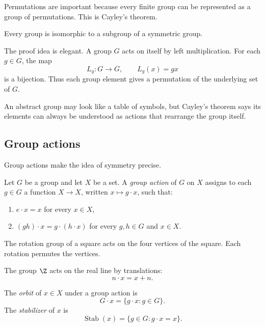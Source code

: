 Permutations are important because every finite group can be represented as a
group of permutations. This is Cayley's theorem.

\begin{theorem}
Every group is isomorphic to a subgroup of a symmetric group.
\end{theorem}

The proof idea is elegant. A group $G$ acts on itself by left multiplication.
For each $g\in G$, the map
\[
L_g:G\to G,\qquad L_g(x)=gx
\]
is a bijection. Thus each group element gives a permutation of the underlying
set of $G$.

\begin{intuitionbox}
An abstract group may look like a table of symbols, but Cayley's theorem says
its elements can always be understood as actions that rearrange the group
itself.
\end{intuitionbox}

\subsection{Group actions}

Group actions make the idea of symmetry precise.

\begin{definition}
Let $G$ be a group and let $X$ be a set. A \emph{group action} of $G$ on $X$
assigns to each $g\in G$ a function $X\to X$, written $x\mapsto g\cdot x$,
such that:
\begin{enumerate}
\item $e\cdot x=x$ for every $x\in X$,
\item $(gh)\cdot x=g\cdot(h\cdot x)$ for every $g,h\in G$ and $x\in X$.
\end{enumerate}
\end{definition}

\begin{example}
The rotation group of a square acts on the four vertices of the square. Each
rotation permutes the vertices.
\end{example}

\begin{example}
The group $\Z$ acts on the real line by translations:
\[
n\cdot x=x+n.
\]
\end{example}

\begin{definition}
The \emph{orbit} of $x\in X$ under a group action is
\[
G\cdot x=\{g\cdot x:g\in G\}.
\]
The \emph{stabilizer} of $x$ is
\[
\operatorname{Stab}(x)=\{g\in G:g\cdot x=x\}.
\]
\end{definition}

